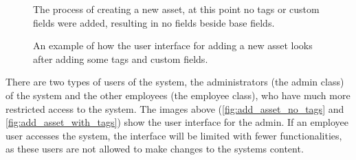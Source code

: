 \begin{figure}[H]
    \centering
    \caption{The process of creating a new asset, at this point no tags or custom fields were added, resulting in no fields beside base fields.}
    \label{fig:add_asset_no_tags}
\end{figure}

\begin{figure}[H]
    \centering
    \caption{An example of how the user interface for adding a new asset looks after adding some tags and custom fields.}
    \label{fig:add_asset_with_tags}
\end{figure}

There are two types of users of the system, the administrators (the admin class) of the system and the other employees (the employee class), who have much more restricted access to the system. The images above (\autoref{fig:add_asset_no_tags} and \autoref{fig:add_asset_with_tags}) show the user interface for the admin. If an employee user accesses the system, the interface will be limited with fewer functionalities, as these users are not allowed to make changes to the systems content.